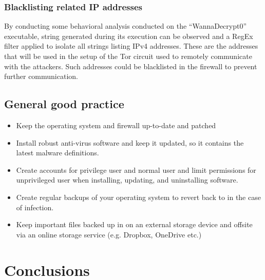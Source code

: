 \documentclass[10pt,a4paper]{article}
\begin{document}
\subsubsection{Blacklisting related IP addresses}
By conducting some behavioral analysis conducted on the ``WannaDecrypt0'' executable, string generated during its execution can be observed and a RegEx filter applied to isolate all strings listing IPv4 addresses. These are the addresses that will be used in the setup of the Tor circuit used to remotely communicate with the attackers. Such addresses could be blacklisted in the firewall to prevent further communication.

\subsection{General good practice}
\begin{itemize}
\item Keep the operating system and firewall up-to-date and patched
\item Install robust anti-virus software and keep it updated, so it contains the latest malware definitions.
\item Create accounts for privilege user and normal user and limit permissions for unprivileged user when installing, updating, and uninstalling software.
\item Create regular backups of your operating system to revert back to in the case of infection.
\item Keep important files backed up in on an external storage device and offsite via an online storage service (e.g. Dropbox, OneDrive etc.)
\end{itemize}


\section{Conclusions}

\newpage
\end{document}
